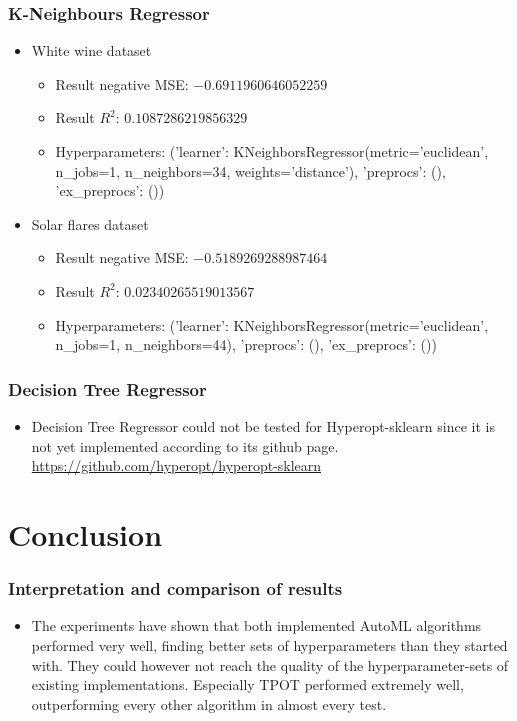 \documentclass{beamer}
\begin{document}
\frame
{
  \frametitle{K-Neighbours Regressor}

  \begin{itemize}
    \item White wine dataset
    \begin{itemize}
      \item Result negative MSE: $-0.6911960646052259$
      \item Result $R^{2}$: $0.1087286219856329$
      \item Hyperparameters: ('learner': KNeighborsRegressor(metric='euclidean', n\_jobs=1, n\_neighbors=34,
      weights='distance'), 'preprocs': (), 'ex\_preprocs': ())
    \end{itemize}
    \item Solar flares dataset
    \begin{itemize}
      \item Result negative MSE: $-0.5189269288987464$
      \item Result $R^{2}$: $0.02340265519013567$
      \item Hyperparameters: ('learner': KNeighborsRegressor(metric='euclidean', n\_jobs=1, n\_neighbors=44), 'preprocs': (), 'ex\_preprocs': ())
    \end{itemize}
  \end{itemize}
}

\frame
{
  \frametitle{Decision Tree Regressor}

  \begin{itemize}
    \item Decision Tree Regressor could not be tested for Hyperopt-sklearn since it is not yet implemented according to its github page.\\
    \url{https://github.com/hyperopt/hyperopt-sklearn}
  \end{itemize}
}

\section{Conclusion}
\frame
{
  \frametitle{Interpretation and comparison of results}

  \begin{itemize}
    \item The experiments have shown that both implemented AutoML algorithms performed very well, finding better sets of hyperparameters than they started with. They could however not reach the quality of the hyperparameter-sets of existing implementations. Especially TPOT performed extremely well, outperforming every other algorithm in almost every test. 
  \end{itemize}
}
\end{document}
